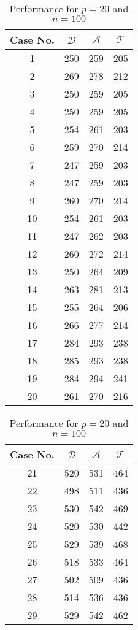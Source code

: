
\begin{table}
\parbox{.45\linewidth}{
\centering
\begin{tabular}{|c|c|c|c|}
\hline
Case No. & $\mathcal{D}$ & $\mathcal{A}$ & $\mathcal{T}$ \\
\hline
1   & 250   & 259   & 205   \\
2   & 269   & 278   & 212   \\
3   & 250   & 259   & 205   \\
4   & 250   & 259   & 205   \\
5   & 254   & 261   & 203   \\
6   & 259   & 270   & 214   \\
7   & 247   & 259   & 203   \\
8   & 247   & 259   & 203   \\
9   & 260   & 270   & 214   \\
10  & 254   & 261   & 203   \\
11  & 247   & 262   & 203   \\
12  & 260   & 272   & 214   \\
13  & 250   & 264   & 209   \\
14  & 263   & 281   & 213   \\
15  & 255   & 264   & 206   \\
16  & 266   & 277   & 214   \\
17  & 284   & 293   & 238   \\
18  & 285   & 293   & 238   \\
19  & 284   & 294   & 241   \\
20  & 261   & 270   & 216   \\
\hline
\end{tabular}
\caption{Performance for $p=20$ and $n=100$}
\label{tab:dat-20}
}
\hfill
\parbox{.45\linewidth}{
\centering
\begin{tabular}{|c|c|c|c|}
\hline
Case No. & $\mathcal{D}$ & $\mathcal{A}$ & $\mathcal{T}$ \\
\hline
21 & 520 & 531 & 464 \\
22 & 498 & 511 & 436 \\
23 & 530 & 542 & 469 \\
24 & 520 & 530 & 442 \\
25 & 529 & 539 & 468 \\
26 & 518 & 533 & 464 \\
27 & 502 & 509 & 436 \\
28 & 514 & 536 & 436 \\
29 & 529 & 542 & 462 \\

\end{tabular}}
\end{table}
